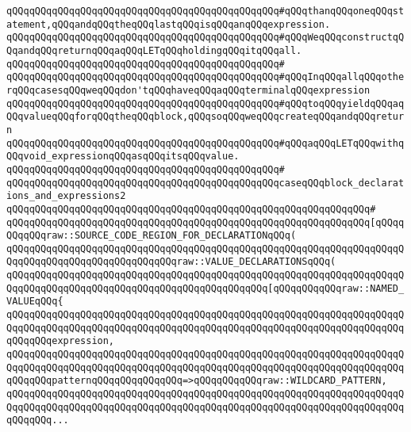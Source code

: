 \verb|qQQqqQQqqQQqqQQqqQQqqQQqqQQqqQQqqQQqqQQqqQQqqQQq#qQQqthanqQQqoneqQQqstatement,qQQqandqQQqtheqQQqlastqQQqisqQQqanqQQqexpression.|\newline
\verb|qQQqqQQqqQQqqQQqqQQqqQQqqQQqqQQqqQQqqQQqqQQqqQQq#qQQqWeqQQqconstructqQQqandqQQqreturnqQQqaqQQqLETqQQqholdingqQQqitqQQqall.|\newline
\verb|qQQqqQQqqQQqqQQqqQQqqQQqqQQqqQQqqQQqqQQqqQQqqQQq#|\newline
\verb|qQQqqQQqqQQqqQQqqQQqqQQqqQQqqQQqqQQqqQQqqQQqqQQq#qQQqInqQQqallqQQqotherqQQqcasesqQQqweqQQqdon'tqQQqhaveqQQqaqQQqterminalqQQqexpression|\newline
\verb|qQQqqQQqqQQqqQQqqQQqqQQqqQQqqQQqqQQqqQQqqQQqqQQq#qQQqtoqQQqyieldqQQqaqQQqvalueqQQqforqQQqtheqQQqblock,qQQqsoqQQqweqQQqcreateqQQqandqQQqreturn|\newline
\verb|qQQqqQQqqQQqqQQqqQQqqQQqqQQqqQQqqQQqqQQqqQQqqQQq#qQQqaqQQqLETqQQqwithqQQqvoid_expressionqQQqasqQQqitsqQQqvalue.|\newline
\verb|qQQqqQQqqQQqqQQqqQQqqQQqqQQqqQQqqQQqqQQqqQQqqQQq#|\newline
\verb|qQQqqQQqqQQqqQQqqQQqqQQqqQQqqQQqqQQqqQQqqQQqqQQqcaseqQQqblock_declarations_and_expressions2|\newline
\verb|qQQqqQQqqQQqqQQqqQQqqQQqqQQqqQQqqQQqqQQqqQQqqQQqqQQqqQQqqQQqqQQq#|\newline
\verb|qQQqqQQqqQQqqQQqqQQqqQQqqQQqqQQqqQQqqQQqqQQqqQQqqQQqqQQqqQQqqQQq[qQQqqQQqqQQqraw::SOURCE_CODE_REGION_FOR_DECLARATIONqQQq(|\newline
\verb|qQQqqQQqqQQqqQQqqQQqqQQqqQQqqQQqqQQqqQQqqQQqqQQqqQQqqQQqqQQqqQQqqQQqqQQqqQQqqQQqqQQqqQQqqQQqqQQqqQQqraw::VALUE_DECLARATIONSqQQq(|\newline
\verb|qQQqqQQqqQQqqQQqqQQqqQQqqQQqqQQqqQQqqQQqqQQqqQQqqQQqqQQqqQQqqQQqqQQqqQQqqQQqqQQqqQQqqQQqqQQqqQQqqQQqqQQqqQQqqQQqqQQq[qQQqqQQqqQQqraw::NAMED_VALUEqQQq{|\newline
\verb|qQQqqQQqqQQqqQQqqQQqqQQqqQQqqQQqqQQqqQQqqQQqqQQqqQQqqQQqqQQqqQQqqQQqqQQqqQQqqQQqqQQqqQQqqQQqqQQqqQQqqQQqqQQqqQQqqQQqqQQqqQQqqQQqqQQqqQQqqQQqqQQqqQQqexpression,|\newline
\verb|qQQqqQQqqQQqqQQqqQQqqQQqqQQqqQQqqQQqqQQqqQQqqQQqqQQqqQQqqQQqqQQqqQQqqQQqqQQqqQQqqQQqqQQqqQQqqQQqqQQqqQQqqQQqqQQqqQQqqQQqqQQqqQQqqQQqqQQqqQQqqQQqqQQqpatternqQQqqQQqqQQqqQQq=>qQQqqQQqqQQqraw::WILDCARD_PATTERN,|\newline
\verb|qQQqqQQqqQQqqQQqqQQqqQQqqQQqqQQqqQQqqQQqqQQqqQQqqQQqqQQqqQQqqQQqqQQqqQQqqQQqqQQqqQQqqQQqqQQqqQQqqQQqqQQqqQQqqQQqqQQqqQQqqQQqqQQqqQQqqQQqqQQqqQQqqQQq...|\newline
